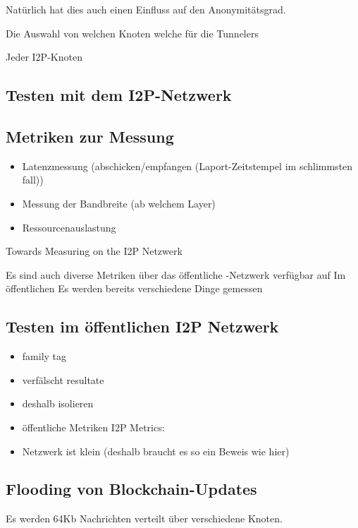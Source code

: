 Natürlich hat dies auch einen Einfluss auf den Anonymitätsgrad.
\parencite[S.~4-5]{timpanaro_monitoring_nodate}

Die Auswahl von welchen Knoten welche für die Tunnelers

Jeder I2P-Knoten


\subsection{Testen mit dem I2P-Netzwerk}

\subsection{Metriken zur Messung}

\begin{itemize}
    \item Latenzmessung (abschicken/empfangen (Laport-Zeitstempel im schlimmsten fall))
    \item Messung der Bandbreite (ab welchem Layer)
    \item Ressourcenauslastung
\end{itemize}

Towards Measuring on the I2P Netzwerk
\cite{wang_towards_2013}


Es sind auch diverse Metriken über das öffentliche -Netzwerk verfügbar auf
Im öffentlichen  Es werden bereits verschiedene Dinge gemessen


\cite{timpanaro_monitoring_nodate}

\subsection{Testen im öffentlichen I2P Netzwerk}

\begin{itemize}
    \item family tag \cite{noauthor_family_nodate}
    \item verfälscht resultate
    \item deshalb isolieren
    \item öffentliche Metriken  I2P Metrics: \cite{noauthor_i2p_nodate-4}
    \item Netzwerk ist klein (deshalb braucht es so ein Beweis wie hier)
\end{itemize}

\cite{timpanaro_monitoring_nodate}

\subsection{Flooding von Blockchain-Updates}

Es werden 64Kb Nachrichten verteilt über verschiedene Knoten.
